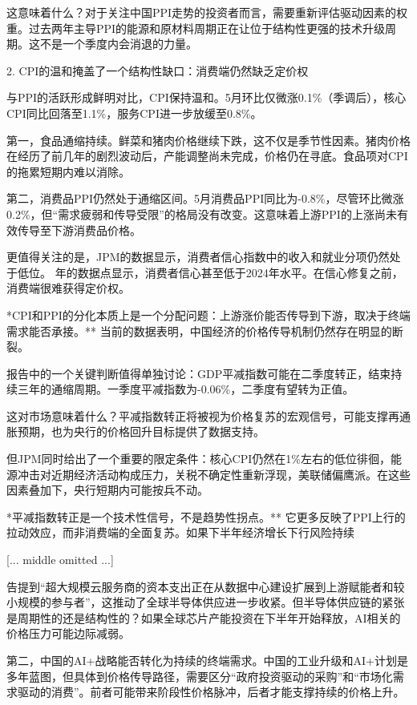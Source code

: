 \documentclass[11pt]{ctexart}
\begin{document}
这意味着什么？对于关注中国PPI走势的投资者而言，需要重新评估驱动因素的权重。过去两年主导PPI的能源和原材料周期正在让位于结构性更强的技术升级周期。这不是一个季度内会消退的力量。

2. CPI的温和掩盖了一个结构性缺口：消费端仍然缺乏定价权

与PPI的活跃形成鲜明对比，CPI保持温和。5月环比仅微涨0.1\%（季调后），核心CPI同比回落至1.1\%，服务CPI进一步放缓至0.8\%。

第一，食品通缩持续。鲜菜和猪肉价格继续下跌，这不仅是季节性因素。猪肉价格在经历了前几年的剧烈波动后，产能调整尚未完成，价格仍在寻底。食品项对CPI的拖累短期内难以消除。

第二，消费品PPI仍然处于通缩区间。5月消费品PPI同比为-0.8\%，尽管环比微涨0.2\%，但“需求疲弱和传导受限”的格局没有改变。这意味着上游PPI的上涨尚未有效传导至下游消费品价格。

更值得关注的是，JPM的数据显示，消费者信心指数中的收入和就业分项仍然处于低位。 年的数据点显示，消费者信心甚至低于2024年水平。在信心修复之前，消费端很难获得定价权。

*CPI和PPI的分化本质上是一个分配问题：上游涨价能否传导到下游，取决于终端需求能否承接。** 当前的数据表明，中国经济的价格传导机制仍然存在明显的断裂。

报告中的一个关键判断值得单独讨论：GDP平减指数可能在二季度转正，结束持续三年的通缩周期。一季度平减指数为-0.06\%，二季度有望转为正值。

这对市场意味着什么？平减指数转正将被视为价格复苏的宏观信号，可能支撑再通胀预期，也为央行的价格回升目标提供了数据支持。

但JPM同时给出了一个重要的限定条件：核心CPI仍然在1\%左右的低位徘徊，能源冲击对近期经济活动构成压力，关税不确定性重新浮现，美联储偏鹰派。在这些因素叠加下，央行短期内可能按兵不动。

*平减指数转正是一个技术性信号，不是趋势性拐点。** 它更多反映了PPI上行的拉动效应，而非消费端的全面复苏。如果下半年经济增长下行风险持续

[... middle omitted ...]

告提到“超大规模云服务商的资本支出正在从数据中心建设扩展到上游赋能者和较小规模的参与者”，这推动了全球半导体供应进一步收紧。但半导体供应链的紧张是周期性的还是结构性的？如果全球芯片产能投资在下半年开始释放，AI相关的价格压力可能边际减弱。

第二，中国的AI+战略能否转化为持续的终端需求。中国的工业升级和AI+计划是多年蓝图，但具体到价格传导路径，需要区分“政府投资驱动的采购”和“市场化需求驱动的消费”。前者可能带来阶段性价格脉冲，后者才能支撑持续的价格上升。
\end{document}
